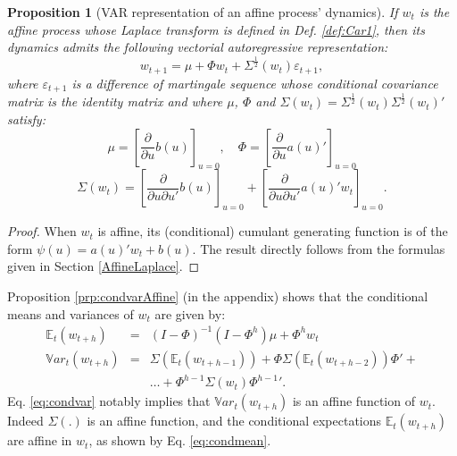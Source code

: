 \documentclass[
  12pt,
]{book}
\newtheorem{proposition}{Proposition}[chapter]
\theoremstyle{definition}
\theoremstyle{definition}
\theoremstyle{definition}
\theoremstyle{definition}
\theoremstyle{remark}
\begin{document}
\begin{proposition}[VAR representation of an affine process' dynamics]
\protect\hypertarget{prp:affineVAR}{}\label{prp:affineVAR}If \(w_t\) is the affine process whose Laplace transform is defined in Def. \ref{def:Car1}, then its dynamics admits the following vectorial autoregressive representation:
\begin{equation}
w_{t+1} = \mu + \Phi w_{t} + \Sigma^{\frac{1}{2}}(w_t) \varepsilon_{t+1},\label{eq:VARw}
\end{equation}
where \(\varepsilon_{t+1}\) is a difference of martingale sequence whose conditional covariance matrix is the identity matrix and where \(\mu\), \(\Phi\) and \(\Sigma(w_t) = \Sigma^{\frac{1}{2}}(w_t){\Sigma^{\frac{1}{2}}(w_t)}'\) satisfy:
\begin{equation}
\mu =  \left[\frac{\partial }{\partial u}b(u)\right]_{u=0}, \quad \Phi= \left[\frac{\partial }{\partial u}a(u)'\right]_{u=0}\label{eq:MUPHI}
\end{equation}
\begin{equation}
\Sigma(w_t) =  \left[\frac{\partial }{\partial u\partial u'}b(u)\right]_{u=0} + \left[\frac{\partial }{\partial u\partial u'}a(u)'w_t\right]_{u=0}.\label{eq:SigmaWt}
\end{equation}
\end{proposition}

\begin{proof}
When \(w_t\) is affine, its (conditional) cumulant generating function is of the form \(\psi(u)=a(u)'w_t+b(u)\). The result directly follows from the formulas given in Section \ref{AffineLaplace}.
\end{proof}

Proposition \ref{prp:condvarAffine} (in the appendix) shows that the conditional means and variances of \(w_t\) are given by:
\begin{eqnarray}
\mathbb{E}_t(w_{t+h}) &=& (I - \Phi)^{-1}(I - \Phi^h)\mu + \Phi^h w_t \label{eq:condmean}\\
\mathbb{V}ar_t(w_{t+h}) &=& \Sigma(\mathbb{E}_t(w_{t+h-1}))+\Phi \Sigma(\mathbb{E}_t(w_{t+h-2}))\Phi' + \nonumber \\
&& \dots + \Phi^{h-1} \Sigma(w_{t}){\Phi^{h-1}}'. \label{eq:condvar}
\end{eqnarray}
Eq. \eqref{eq:condvar} notably implies that \(\mathbb{V}ar_t(w_{t+h})\) is an affine function of \(w_t\). Indeed \(\Sigma(.)\) is an affine function, and the conditional expectations \(\mathbb{E}_t(w_{t+h})\) are affine in \(w_t\), as shown by Eq. \eqref{eq:condmean}.
\end{document}
